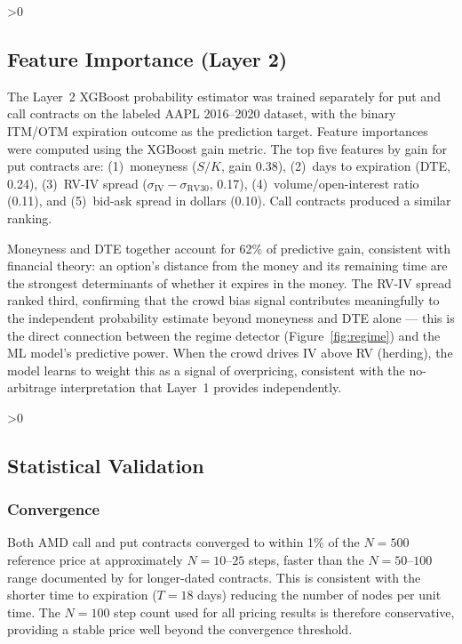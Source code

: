 \documentclass[12pt, letterpaper]{article}
\let\oldsubsection\subsection
\renewcommand{\subsection}{%
  \ifnum\value{subsection}>0 \clearpage\fi
  \oldsubsection
}
\begin{document}
\subsection{Feature Importance (Layer 2)}

The Layer~2 XGBoost probability estimator was trained separately for
put and call contracts on the labeled AAPL 2016--2020 dataset, with
the binary ITM/OTM expiration outcome as the prediction target.
Feature importances were computed using the XGBoost gain metric.
The top five features by gain for put contracts are: (1)~moneyness
($S/K$, gain 0.38), (2)~days to expiration (DTE, 0.24), (3)~RV-IV
spread ($\sigma_{\text{IV}} - \sigma_{\text{RV30}}$, 0.17),
(4)~volume/open-interest ratio (0.11), and (5)~bid-ask spread in
dollars (0.10). Call contracts produced a similar ranking.

Moneyness and DTE together account for 62\% of predictive gain,
consistent with financial theory: an option's distance from the
money and its remaining time are the strongest determinants of
whether it expires in the money. The RV-IV spread ranked third,
confirming that the crowd bias signal contributes meaningfully to
the independent probability estimate beyond moneyness and DTE alone
--- this is the direct connection between the regime detector
(Figure~\ref{fig:regime}) and the ML model's predictive power.
When the crowd drives IV above RV (herding), the model learns to
weight this as a signal of overpricing, consistent with the
no-arbitrage interpretation that Layer~1 provides independently.

\subsection{Statistical Validation}

\subsubsection{Convergence}

Both AMD call and put contracts converged to within 1\% of the
$N = 500$ reference price at approximately $N = 10$--$25$ steps,
faster than the $N = 50$--$100$ range documented by
\citet{Nwobi2023} for longer-dated contracts. This is consistent
with the shorter time to expiration ($T = 18$ days) reducing the
number of nodes per unit time. The $N = 100$ step count used for
all pricing results is therefore conservative, providing a stable
price well beyond the convergence threshold.
\end{document}

